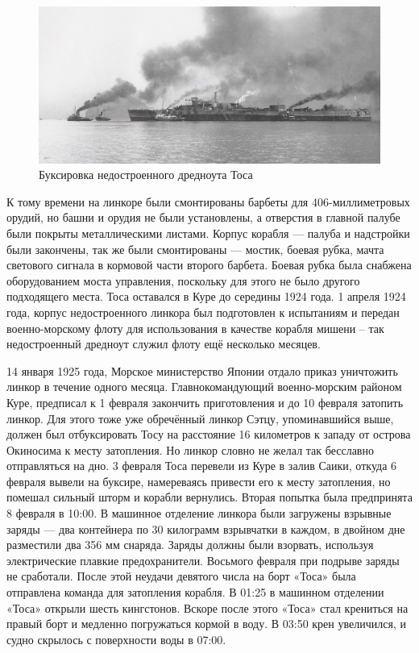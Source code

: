 \begin{figure}[h!tb] 
	\centering\includegraphics[scale=0.2]{Glava7/6xIYCX30oEs.jpg}
	\caption{Буксировка недостроенного дредноута Тоса}%
\end{figure}

К тому времени на линкоре были смонтированы барбеты для 406-миллиметровых орудий, но башни и орудия не были установлены, а отверстия в главной палубе были покрыты металлическими листами. Корпус корабля — палуба и надстройки были закончены, так же были смонтированы — мостик, боевая рубка, мачта светового сигнала в кормовой части второго барбета. Боевая рубка была снабжена оборудованием моста управления, поскольку для этого не было другого подходящего места. Тоса оставался в Куре до середины 1924 года. 1 апреля 1924 года, корпус недостроенного линкора был подготовлен к испытаниям и передан военно-морскому флоту для использования в качестве корабля мишени – так недостроенный дредноут служил флоту ещё несколько месяцев.

14 января 1925 года, Морское министерство Японии отдало приказ уничтожить линкор в течение одного месяца. Главнокомандующий военно-морским районом Куре, предписал к 1 февраля закончить приготовления и до 10 февраля затопить линкор. Для этого тоже уже обречённый линкор Сэтцу, упоминавшийся выше, должен был отбуксировать Тосу на расстояние 16 километров к западу от острова Окиносима к месту затопления. Но линкор словно не желал так бесславно отправляться на дно. 3 февраля Тоса перевели из Куре в залив Саики, откуда 6 февраля вывели на буксире, намереваясь привести его к месту затопления, но помешал сильный шторм и корабли вернулись. Вторая попытка была предпринята 8 февраля в 10:00. В машинное отделение линкора были загружены взрывные заряды — два контейнера по 30 килограмм взрывчатки в каждом, в двойном дне разместили два 356 мм снаряда. Заряды должны были взорвать, используя электрические плавкие предохранители. Восьмого февраля при подрыве заряды не сработали. После этой неудачи девятого числа на борт «Тоса» была отправлена команда для затопления корабля. В 01:25 в машинном отделении «Тоса» открыли шесть кингстонов. Вскоре после этого «Тоса» стал крениться на правый борт и медленно погружаться кормой в воду. В 03:50 крен увеличился, и судно скрылось с поверхности воды в 07:00.

